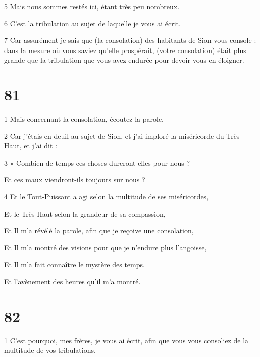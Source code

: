 \par 5 Mais nous sommes restés ici, étant très peu nombreux.

\par 6 C'est la tribulation au sujet de laquelle je vous ai écrit.

\par 7 Car assurément je sais que (la consolation) des habitants de Sion vous console : dans la mesure où vous saviez qu'elle prospérait, (votre consolation) était plus grande que la tribulation que vous avez endurée pour devoir vous en éloigner.

\chapter{81}

\par 1 Mais concernant la consolation, écoutez la parole.

\par 2 Car j'étais en deuil au sujet de Sion, et j'ai imploré la miséricorde du Très-Haut, et j'ai dit :

\par 3 « Combien de temps ces choses dureront-elles pour nous ?

\par Et ces maux viendront-ils toujours sur nous ?

\par 4 Et le Tout-Puissant a agi selon la multitude de ses miséricordes,

\par Et le Très-Haut selon la grandeur de sa compassion,

\par Et Il m'a révélé la parole, afin que je reçoive une consolation,

\par Et Il m'a montré des visions pour que je n'endure plus l'angoisse,

\par Et Il m'a fait connaître le mystère des temps.

\par Et l'avènement des heures qu'il m'a montré.

\chapter{82}

\par 1 C'est pourquoi, mes frères, je vous ai écrit, afin que vous vous consoliez de la multitude de vos tribulations.

